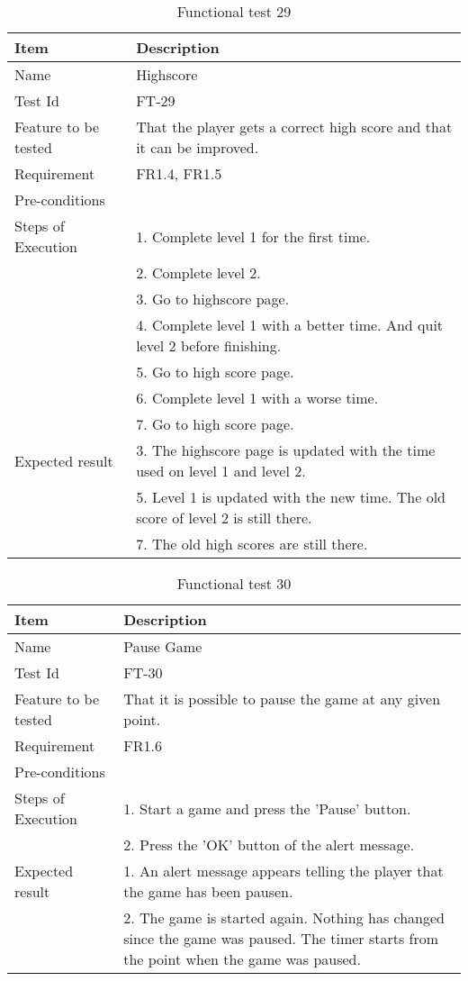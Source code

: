 \begin{table}[H]
\centering
	\begin{tabular}{ l | p{8cm} }
		\hline
		{\bf Item} & {\bf Description} \\ \hline
		Name & Highscore \\ 
		Test Id & FT-29 \\ 
		Feature to be tested & That the player gets a correct high score and that it can be improved. \\ 
		Requirement & FR1.4, FR1.5 \\ 
		Pre-conditions & \\ 
		Steps of Execution & 1. Complete level 1 for the first time. \\
		& 2. Complete level 2. \\
		& 3. Go to highscore page. \\
		& 4. Complete level 1 with a better time. And quit level 2 before finishing. \\
		& 5. Go to high score page. \\
		& 6. Complete level 1 with a worse time. \\
		& 7. Go to high score page. \\
		Expected result & 3. The highscore page is updated with the time used on level 1 and level 2. \\
		& 5. Level 1 is updated with the new time. The old score of level 2 is still there. \\
		& 7. The old high scores are still there. \\
	\end{tabular}
	\caption{Functional test 29}
\end{table}

\begin{table}[H]
\centering
	\begin{tabular}{ l | p{8cm} }
		\hline
		{\bf Item} & {\bf Description} \\ \hline
		Name & Pause Game \\ 
		Test Id & FT-30 \\ 
		Feature to be tested & That it is possible to pause the game at any given point. \\ 
		Requirement & FR1.6 \\ 
		Pre-conditions & \\ 
		Steps of Execution & 1. Start a game and press the 'Pause' button. \\
		& 2. Press the 'OK' button of the alert message. \\
		Expected result & 1. An alert message appears telling the player that the game has been pausen. \\
		& 2. The game is started again. Nothing has changed since the game was paused. The timer starts from the point when the game was paused. \\
	\end{tabular}
	\caption{Functional test 30}
\end{table}

